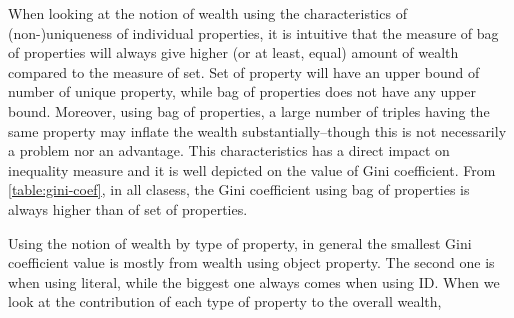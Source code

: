 When looking at the notion of wealth using the characteristics of (non-)uniqueness of individual properties, it is intuitive that the measure of bag of properties will always give higher (or at least, equal) amount of wealth compared to the measure of set. Set of property will have an upper bound of number of unique property, while bag of properties does not have any upper bound. Moreover, using bag of properties, a large number of triples having the same property may inflate the wealth substantially--though this is not necessarily a problem nor an advantage. This characteristics has a direct impact on inequality measure and it is well depicted on the value of Gini coefficient. From \autoref{table:gini-coef}, in all clasess, the Gini coefficient using bag of properties is always higher than of set of properties.

Using the notion of wealth by type of property, in general the smallest Gini coefficient value is mostly from wealth using object property. The second one is when using literal, while the biggest one always comes when using ID. When we look at the contribution of each type of property to the overall wealth, 


